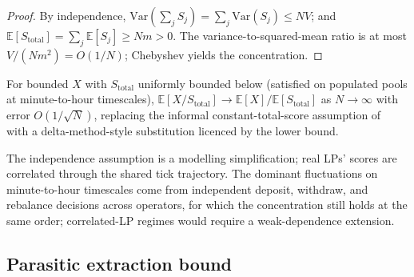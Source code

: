 \documentclass[11pt,a4paper]{article}
\theoremstyle{cgdefinition}
\theoremstyle{cgplain}
\theoremstyle{cgremark}
\begin{document}
\begin{proof}
By independence, $\mathrm{Var}(\sum_j S_j) = \sum_j \mathrm{Var}(S_j) \leq NV$; and $\mathbb{E}[S_{\text{total}}] = \sum_j \mathbb{E}[S_j] \geq Nm > 0$. The variance-to-squared-mean ratio is at most $V/(Nm^2) = O(1/N)$; Chebyshev yields the concentration.
\end{proof}

For bounded $X$ with $S_{\text{total}}$ uniformly bounded below (satisfied on populated pools at minute-to-hour timescales), $\mathbb{E}[X/S_{\text{total}}] \to \mathbb{E}[X]/\mathbb{E}[S_{\text{total}}]$ as $N \to \infty$ with error $O(1/\sqrt{N})$, replacing the informal constant-total-score assumption of~\cite[\S5]{ryan2026c} with a delta-method-style substitution licenced by the lower bound.

The independence assumption is a modelling simplification; real LPs' scores are correlated through the shared tick trajectory. The dominant fluctuations on minute-to-hour timescales come from independent deposit, withdraw, and rebalance decisions across operators, for which the concentration still holds at the same order; correlated-LP regimes would require a weak-dependence extension.

\subsection{Parasitic extraction bound}\label{sec:parasitic-thm}
\end{document}
